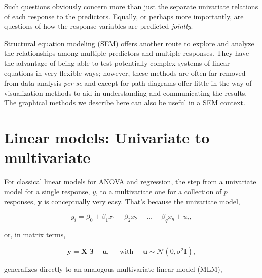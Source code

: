 \documentclass[
  letterpaper,
  10pt,
  krantz2]{krantz}
\begin{document}
Such questions obviously concern more than just the separate univariate
relations of each response to the predictors. Equally, or perhaps more
importantly, are questions of how the response variables are predicted
\emph{jointly}.

\begin{tcolorbox}[enhanced jigsaw, title=\textcolor{quarto-callout-note-color}{\faInfo}\hspace{0.5em}{SEM}, arc=.35mm, left=2mm, coltitle=black, colback=white, colbacktitle=quarto-callout-note-color!10!white, titlerule=0mm, toprule=.15mm, bottomrule=.15mm, rightrule=.15mm, leftrule=.75mm, breakable, opacitybacktitle=0.6, bottomtitle=1mm, toptitle=1mm, opacityback=0, colframe=quarto-callout-note-color-frame]

Structural equation modeling (SEM) offers another route to explore and
analyze the relationships among multiple predictors and multiple
responses. They have the advantage of being able to test potentially
complex systems of linear equations in very flexible ways; however,
these methods are often far removed from data analysis \emph{per se} and
except for path diagrams offer little in the way of visualization
methods to aid in understanding and communicating the results. The
graphical methods we describe here can also be useful in a SEM context.

\end{tcolorbox}

\hypertarget{linear-models-univariate-to-multivariate}{%
\section{Linear models: Univariate to
multivariate}\label{linear-models-univariate-to-multivariate}}

For classical linear models for ANOVA and regression, the step from a
univariate model for a single response, \(y\), to a multivariate one for
a collection of \(p\) responses, \(\mathbf{y}\) is conceptually very
easy. That's because the univariate model,

\[y_i = \beta_0 + \beta_1 x_1 + \beta_2 x_2 + \dots + \beta_q x_q + u_i , \]

or, in matrix terms,

\[\mathbf{y} = \mathbf{X} \; \mathbf{\beta} + \mathbf{u}, \quad\mbox{   with   }\quad \mathbf{u} \sim \mathcal{N} (0, \sigma^2 \mathbf{I}) ,\]

generalizes directly to an analogous multivariate linear model (MLM),
\end{document}
